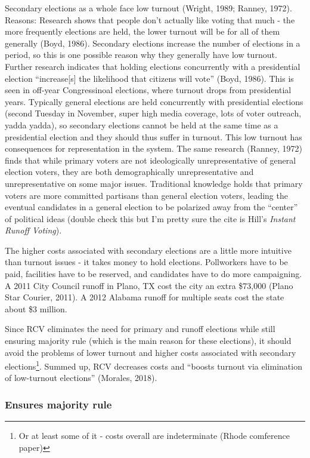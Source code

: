 \documentclass[12pt,twoside]{reedthesis}
\theoremstyle{definition}
\theoremstyle{definition}
\theoremstyle{definition}
\theoremstyle{remark}
\begin{document}
Secondary elections as a whole face low turnout (Wright, 1989; Ranney,
1972). Reasons: Research shows that people don't actually like voting
that much - the more frequently elections are held, the lower turnout
will be for all of them generally (Boyd, 1986). Secondary elections
increase the number of elections in a period, so this is one possible
reason why they generally have low turnout. Further research indicates
that holding elections concurrently with a presidential election
``increase{[}s{]} the likelihood that citizens will vote'' (Boyd, 1986).
This is seen in off-year Congressinoal elections, where turnout drops
from presidential years. Typically general elections are held
concurrently with presidential elections (second Tuesday in November,
super high media coverage, lots of voter outreach, yadda yadda), so
secondary elections cannot be held at the same time as a presidential
election and they should thus suffer in turnout. This low turnout has
consequences for representation in the system. The same research
(Ranney, 1972) finds that while primary voters are not ideologically
unrepresentative of general election voters, they are both
demographically unrepresentative and unrepresentative on some major
issues. Traditional knowledge holds that primary voters are more
committed partisans than general election voters, leading the eventual
candidates in a general election to be polarized away from the
``center'' of political ideas (double check this but I'm pretty sure the
cite is Hill's \emph{Instant Runoff Voting}).

The higher costs associated with secondary elections are a little more
intuitive than turnout issues - it takes money to hold elections.
Pollworkers have to be paid, facilities have to be reserved, and
candidates have to do more campaigning. A 2011 City Council runoff in
Plano, TX cost the city an extra \$73,000 (Plano Star Courier, 2011). A
2012 Alabama runoff for multiple seats cost the state about \$3 million.

Since RCV eliminates the need for primary and runoff elections while
still ensuring majority rule (which is the main reason for these
elections), it should avoid the problems of lower turnout and higher
costs associated with secondary elections\footnote{Or at least some of
  it - costs overall are indeterminate (Rhode comference paper)}. Summed
up, RCV decreases costs and ``boosts turnout via elimination of
low-turnout elections'' (Morales, 2018).

\hypertarget{ensures-majority-rule}{%
\subsubsection{Ensures majority rule}\label{ensures-majority-rule}}
\end{document}
